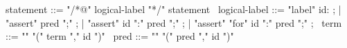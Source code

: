 \begin{syntax}
  statement ::= "/*@" logical-label "*/" statement \
  logical-label ::= "label" id: ;
  | "assert" pred ";" ;
  | "assert" id ":" pred ";" ;
  | "assert" "for" id ":" pred ";" ;
  \
  term ::= "\at" "(" term "," id ")" 
  \
  pred ::= "\at" "(" pred "," id ")" 
\end{syntax}
